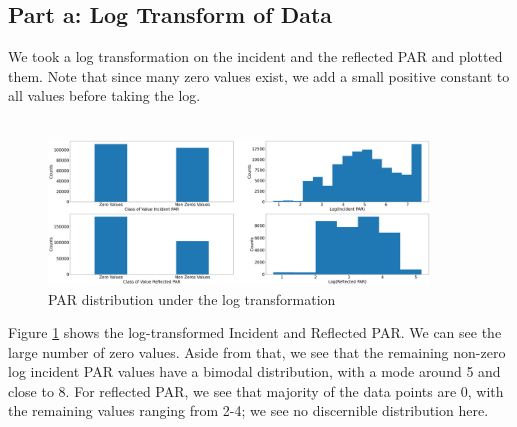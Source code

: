\documentclass[11pt, letterpaper]{article}
\begin{document}
\subsection{Part a: Log Transform of Data}
We took a log transformation on the incident and the reflected PAR and plotted them. Note that since many zero values exist, we add a small positive constant to all values before taking the log.
\\ \\
\begin{figure}[h!]
\centering
\captionsetup{justification=centering}
\includegraphics[width=0.9\textwidth]{Report Images/graph_critique_a_v2.png}
\caption{PAR distribution under the log transformation}
\label{fig:graph_crtique_a}
\end{figure}
Figure \ref{fig:graph_crtique_a} shows the log-transformed Incident and Reflected PAR. We can see the large number of zero values. Aside from that, we see that the remaining non-zero log incident PAR values have a bimodal distribution, with a mode around 5 and close to 8. For reflected PAR, we see that majority of the data points are 0, with the remaining values ranging from 2-4; we see no discernible distribution here.
\end{document}
